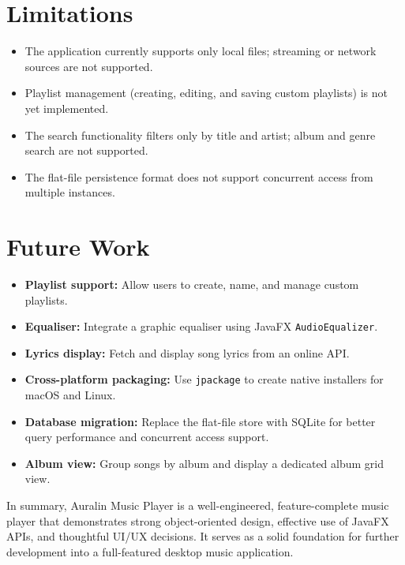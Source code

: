﻿\documentclass[12pt]{report}
\begin{document}
\section{Limitations}
\begin{itemize}
    \item The application currently supports only local files; streaming or network sources are not supported.
    \item Playlist management (creating, editing, and saving custom playlists) is not yet implemented.
    \item The search functionality filters only by title and artist; album and genre search are not supported.
    \item The flat-file persistence format does not support concurrent access from multiple instances.
\end{itemize}

\section{Future Work}
\begin{itemize}
    \item \textbf{Playlist support:} Allow users to create, name, and manage custom playlists.
    \item \textbf{Equaliser:} Integrate a graphic equaliser using JavaFX \texttt{AudioEqualizer}.
    \item \textbf{Lyrics display:} Fetch and display song lyrics from an online API.
    \item \textbf{Cross-platform packaging:} Use \texttt{jpackage} to create native installers for macOS and Linux.
    \item \textbf{Database migration:} Replace the flat-file store with SQLite for better query performance and concurrent access support.
    \item \textbf{Album view:} Group songs by album and display a dedicated album grid view.
\end{itemize}

In summary, Auralin Music Player is a well-engineered, feature-complete music player that demonstrates strong object-oriented design, effective use of JavaFX APIs, and thoughtful UI/UX decisions. It serves as a solid foundation for further development into a full-featured desktop music application.

\newpage
\end{document}
